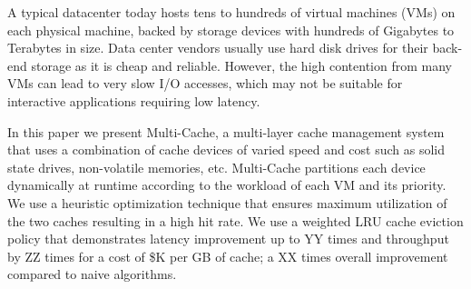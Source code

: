 A typical datacenter today hosts tens to hundreds of virtual machines (VMs) on each physical machine, backed by storage devices with hundreds of Gigabytes to Terabytes in size. Data center vendors usually use hard disk drives for their back-end storage as it is cheap and reliable. However, the high contention from many VMs can lead to very slow I/O accesses, which may not be suitable for interactive applications requiring low latency.

In this paper we present Multi-Cache, a multi-layer cache management system that uses a combination of cache devices of varied speed and cost such as solid state drives, non-volatile memories, etc. Multi-Cache partitions each device dynamically at runtime according to the workload of each VM and its priority. We use a heuristic optimization technique that ensures maximum utilization of the two caches resulting in a high hit rate.
We use a weighted LRU cache eviction policy that demonstrates latency improvement up to YY times and throughput by ZZ times for a cost of \$K per GB of cache; a XX times overall improvement compared to naive algorithms.

